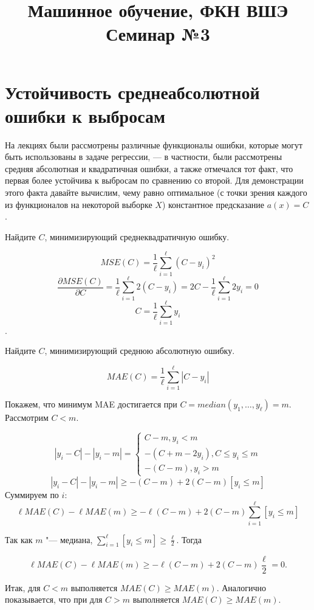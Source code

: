 \documentclass[12pt,fleqn]{article}
\begin{document}
\title{Машинное обучение, ФКН ВШЭ\\Семинар №3}
\author{}
\date{}
\maketitle

\section{Устойчивость среднеабсолютной ошибки к выбросам}
	\par На лекциях были рассмотрены различные функционалы ошибки, которые могут быть использованы в задаче регрессии, — в частности, были рассмотрены средняя абсолютная и квадратичная ошибки, а также отмечался тот факт, что первая более устойчива к выбросам по сравнению со второй. Для демонстрации этого факта давайте вычислим, чему равно оптимальное (с точки зрения каждого из функционалов на некоторой выборке $X$) константное предсказание $a(x) = C$.

	\begin{vkProblem} 
		Найдите $C$, минимизирующий среднеквадратичную ошибку.
	\end{vkProblem}

\begin{esSolution} $$MSE(C) = \frac{1}{\ell} \sum_{i=1}^\ell (C - y_i)^2$$
	$$\frac{\partial MSE (C)}{\partial C} = \frac{1}{\ell} \sum_{i=1}^\ell 2 (C - y_i) = 2 C - \frac{1}{\ell} \sum_{i=1}^\ell 2 y_i = 0$$
	$$C = \frac 1 \ell \sum_{i=1}^\ell y_i$$.
\end{esSolution}

\begin{vkProblem}
	Найдите $C$, минимизирующий среднюю абсолютную ошибку. 
\end{vkProblem}


\begin{esSolution} $$MAE(C) =  \frac{1}{\ell} \sum_{i=1}^\ell |C - y_i|$$
	
	Покажем, что минимум MAE достигается при $C = median(y_1, \dots, y_\ell) = m.$ Рассмотрим $C < m$.
	
	$$|y_i - C| - |y_i - m| = \begin{cases} C - m, y_i < m  \\ - (C + m - 2 y_i), C \leqslant y_i \leqslant m \\ - (C - m), y_i > m \end{cases}$$
	$$|y_i - C| - |y_i - m| \geqslant - (C - m) + 2(C - m) [y_i \leqslant m]$$
	Суммируем по $i$:
	$$\ell MAE(C) - \ell MAE(m) \geqslant - \ell (C - m) + 2 (C - m) \sum_{i=1}^\ell [y_i \leqslant m]$$
	
	Так как $m$ "--- медиана, $\sum_{i=1}^\ell [y_i \leqslant m] \geqslant \frac \ell 2$. Тогда
	
	$$\ell MAE(C) - \ell MAE(m) \geqslant - \ell (C - m) + 2 (C - m) \frac \ell 2 = 0.$$
	
	Итак, для $C < m$ выполняется $MAE(C) \geqslant MAE(m)$. Аналогично показывается, что при для $C > m$ выполняется $MAE(C) \geqslant MAE(m)$.
\end{esSolution}
\end{document}
